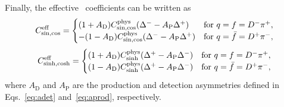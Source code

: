 Finally, the effective \CP~coefficients can be written as
\begin{equation}
        C^{\rm eff}_{\sin,\cos} = 
        \begin{cases}
        (1+A_{\mathrm D})C^{\rm phys}_{\sin,\cos}(\Delta^{-}-A_{\mathrm P}\Delta^{+}) & \text{for } q=f=D^-\pi^+, \\
        -(1-A_{\mathrm D})C^{\rm phys}_{\sin,\cos}(\Delta^{-}-A_{\mathrm P}\Delta^{+}) & \text{for } q=\bar f=D^+\pi^-, \\
        \end{cases}
\end{equation}
\begin{equation}
        C^{\rm eff}_{\sinh,\cosh} =
        \begin{cases}
        (1+A_{\mathrm D})C^{\rm phys}_{\sinh}(\Delta^{+}-A_{\mathrm P}\Delta^{-}) & \text{for } q=f=D^-\pi^+, \\
        (1-A_{\mathrm D})C^{\rm phys}_{\sinh}(\Delta^{+}-A_{\mathrm P}\Delta^{-}) & \text{for } q=\bar f=D^+\pi^-, \\
        \end{cases}
\end{equation}
where $A_{\mathrm D}$ and $A_{\mathrm P}$ are the production and detection asymmetries defined in Eqs.~\ref{eq:adet} and~\ref{eq:aprod}, respectively.
